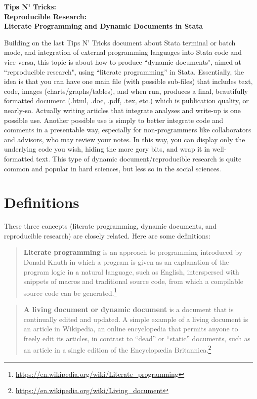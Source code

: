 \documentclass[11pt]{article}
\begin{document}
\thispagestyle{empty}
\pagestyle{plain}
%
\begin{center}
{\bf Tips N' Tricks: \\ 
Reproducible Research:\\
Literate Programming and Dynamic Documents  in Stata}
\end{center}

\noindent Building on the last Tips N' Tricks document about Stata terminal or batch mode, and integration of external programming languages into Stata code and vice versa, this topic is about how to produce ``dynamic documents", aimed at ``reproducible research", using ``literate programming'' in Stata. Essentially, the idea is that you can have one main file (with possible sub-files) that includes text, code, images (charts/graphs/tables), and when run, produces a final, beautifully formatted document (.html, .doc, .pdf, .tex, etc.) which is publication quality, or nearly-so. Actually writing articles that integrate analyses and write-up is one possible use. Another possible use is simply to better integrate code and comments in a presentable way, especially for non-programmers like collaborators and advisors, who may review your notes. In this way, you can display only the underlying code you wish, hiding the more gory bits, and wrap it in well-formatted text. This type of dynamic document/reproducible research is quite common and popular in hard sciences, but less so in the social sciences.

\section*{Definitions}

These three concepts (literate programming, dynamic documents, and reproducible research) are closely related. Here are some definitions:

\begin{quote}
{\bf Literate programming} is an approach to programming introduced by Donald Knuth in which a program is given as an explanation of the program logic in a natural language, such as English, interspersed with snippets of macros and traditional source code, from which a compilable source code can be generated.\footnote{\url{https://en.wikipedia.org/wiki/Literate_programming}}
\end{quote}

\begin{quote}
{\bf A living document or dynamic document} is a document that is continually edited and updated. A simple example of a living document is an article in Wikipedia, an online encyclopedia that permits anyone to freely edit its articles, in contrast to ``dead'' or ``static'' documents, such as an article in a single edition of the Encyclopædia Britannica.\footnote{\url{https://en.wikipedia.org/wiki/Living_document}}
\end{quote}
\end{document}
